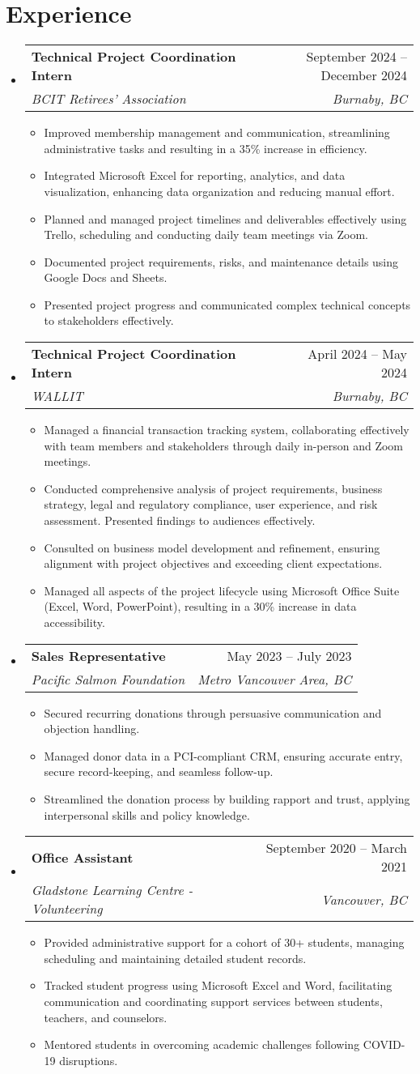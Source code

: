 \documentclass[letterpaper,11pt]{article}
\makeatletter
\newcommand{\resumeItem}[1]{
\item\small{
{#1 \vspace{-2pt}}
}
}
\newcommand{\resumeSubheading}[4]{
\vspace{-2pt}\item
\begin{tabular*}{0.97\textwidth}[t]{l@{\extracolsep{\fill}}r}
\textbf{#1} & #2 \\
\textit{\small#3} & \textit{\small #4} \\
\end{tabular*}\vspace{-7pt}
}
\newcommand{\resumeSubHeadingListStart}{\begin{itemize}[leftmargin=0.15in, label={}]}
\newcommand{\resumeSubHeadingListEnd}{\end{itemize}}
\newcommand{\resumeItemListStart}{\begin{itemize}}
\newcommand{\resumeItemListEnd}{\end{itemize}\vspace{-5pt}}
\makeatother
\begin{document}
\section{Experience}
\resumeSubHeadingListStart
\resumeSubheading{Technical Project Coordination Intern}{September 2024 – December 2024}{BCIT Retirees' Association}{Burnaby, BC}
\resumeItemListStart
\resumeItem{Improved membership management and communication, streamlining administrative tasks and resulting in a 35\% increase in efficiency.}
\resumeItem{Integrated Microsoft Excel for reporting, analytics, and data visualization, enhancing data organization and reducing manual effort.}
\resumeItem{Planned and managed project timelines and deliverables effectively using Trello, scheduling and conducting daily team meetings via Zoom.}
\resumeItem{Documented project requirements, risks, and maintenance details using Google Docs and Sheets.}
\resumeItem{Presented project progress and communicated complex technical concepts to stakeholders effectively.}
\resumeItemListEnd
\resumeSubheading{Technical Project Coordination Intern}{April 2024 – May 2024}{WALLIT}{Burnaby, BC}
\resumeItemListStart
\resumeItem{Managed a financial transaction tracking system, collaborating effectively with team members and stakeholders through daily in-person and Zoom meetings.}
\resumeItem{Conducted comprehensive analysis of project requirements, business strategy, legal and regulatory compliance, user experience, and risk assessment.  Presented findings to audiences effectively.}
\resumeItem{Consulted on business model development and refinement, ensuring alignment with project objectives and exceeding client expectations.}
\resumeItem{Managed all aspects of the project lifecycle using Microsoft Office Suite (Excel, Word, PowerPoint), resulting in a 30\% increase in data accessibility.}
\resumeItemListEnd
\resumeSubheading{Sales Representative}{May 2023 – July 2023}{Pacific Salmon Foundation}{Metro Vancouver Area, BC}
\resumeItemListStart
\resumeItem{Secured recurring donations through persuasive communication and objection handling.}
\resumeItem{Managed donor data in a PCI-compliant CRM, ensuring accurate entry, secure record-keeping, and seamless follow-up.}
\resumeItem{Streamlined the donation process by building rapport and trust, applying interpersonal skills and policy knowledge.}
\resumeItemListEnd
\resumeSubheading{Office Assistant}{September 2020 – March 2021}{Gladstone Learning Centre - Volunteering}{Vancouver, BC}
\resumeItemListStart
\resumeItem{Provided administrative support for a cohort of 30+ students, managing scheduling and maintaining detailed student records.}
\resumeItem{Tracked student progress using Microsoft Excel and Word, facilitating communication and coordinating support services between students, teachers, and counselors.}
\resumeItem{Mentored students in overcoming academic challenges following COVID-19 disruptions.}
\resumeItemListEnd
\resumeSubHeadingListEnd
\end{document}
